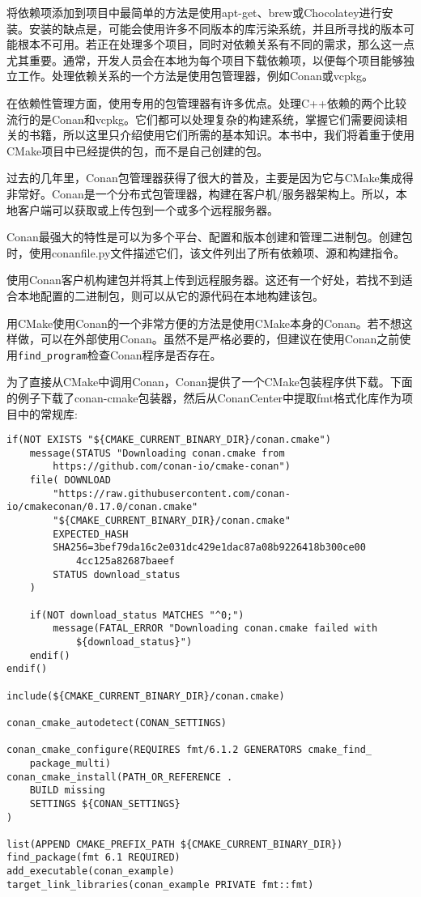 
将依赖项添加到项目中最简单的方法是使用apt-get、brew或Chocolatey进行安装。安装的缺点是，可能会使用许多不同版本的库污染系统，并且所寻找的版本可能根本不可用。若正在处理多个项目，同时对依赖关系有不同的需求，那么这一点尤其重要。通常，开发人员会在本地为每个项目下载依赖项，以便每个项目能够独立工作。处理依赖关系的一个方法是使用包管理器，例如Conan或vcpkg。

在依赖性管理方面，使用专用的包管理器有许多优点。处理C++依赖的两个比较流行的是Conan和vcpkg。它们都可以处理复杂的构建系统，掌握它们需要阅读相关的书籍，所以这里只介绍使用它们所需的基本知识。本书中，我们将着重于使用CMake项目中已经提供的包，而不是自己创建的包。


过去的几年里，Conan包管理器获得了很大的普及，主要是因为它与CMake集成得非常好。Conan是一个分布式包管理器，构建在客户机/服务器架构上。所以，本地客户端可以获取或上传包到一个或多个远程服务器。

Conan最强大的特性是可以为多个平台、配置和版本创建和管理二进制包。创建包时，使用conanfile.py文件描述它们，该文件列出了所有依赖项、源和构建指令。

使用Conan客户机构建包并将其上传到远程服务器。这还有一个好处，若找不到适合本地配置的二进制包，则可以从它的源代码在本地构建该包。

用CMake使用Conan的一个非常方便的方法是使用CMake本身的Conan。若不想这样做，可以在外部使用Conan。虽然不是严格必要的，但建议在使用Conan之前使用\texttt{find\_program}检查Conan程序是否存在。

为了直接从CMake中调用Conan，Conan提供了一个CMake包装程序供下载。下面的例子下载了conan-cmake包装器，然后从ConanCenter中提取fmt格式化库作为项目中的常规库:

\begin{lstlisting}[style=styleCMake]
if(NOT EXISTS "${CMAKE_CURRENT_BINARY_DIR}/conan.cmake")
	message(STATUS "Downloading conan.cmake from
		https://github.com/conan-io/cmake-conan")
	file( DOWNLOAD
		"https://raw.githubusercontent.com/conan-io/cmakeconan/0.17.0/conan.cmake"
		"${CMAKE_CURRENT_BINARY_DIR}/conan.cmake"
		EXPECTED_HASH
		SHA256=3bef79da16c2e031dc429e1dac87a08b9226418b300ce00
			4cc125a82687baeef
		STATUS download_status
	)
	
	if(NOT download_status MATCHES "^0;")
		message(FATAL_ERROR "Downloading conan.cmake failed with
			${download_status}")
	endif()
endif()

include(${CMAKE_CURRENT_BINARY_DIR}/conan.cmake)

conan_cmake_autodetect(CONAN_SETTINGS)

conan_cmake_configure(REQUIRES fmt/6.1.2 GENERATORS cmake_find_
	package_multi)
conan_cmake_install(PATH_OR_REFERENCE .
	BUILD missing
	SETTINGS ${CONAN_SETTINGS}
)

list(APPEND CMAKE_PREFIX_PATH ${CMAKE_CURRENT_BINARY_DIR})
find_package(fmt 6.1 REQUIRED)
add_executable(conan_example)
target_link_libraries(conan_example PRIVATE fmt::fmt)
\end{lstlisting}

